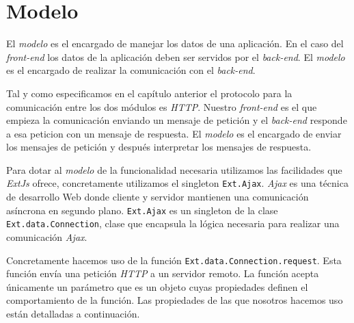 \section{Modelo}
	El \emph{modelo} es el encargado de manejar los datos de una aplicación. En el caso del \emph{front-end} los datos de la aplicación deben ser
	servidos por el \emph{back-end}. El \emph{modelo} es el encargado de realizar la comunicación con el \emph{back-end}. 
	\par
	Tal y como especificamos en el  capítulo anterior el protocolo para la comunicación entre los dos módulos es \emph{HTTP}. Nuestro
	\emph{front-end} es el que empieza la comunicación enviando un mensaje de petición y el \emph{back-end} responde a esa peticion con un mensaje
	de respuesta. El \emph{modelo} es el encargado de enviar los mensajes de petición y después interpretar los mensajes de respuesta.
	\par
	Para dotar al \emph{modelo} de la funcionalidad necesaria utilizamos las facilidades que \emph{ExtJs} ofrece, concretamente utilizamos el singleton
	\texttt{Ext.Ajax}. \emph{Ajax}\cite{AjaxWiki} es una técnica de desarrollo Web donde cliente y servidor mantienen una comunicación asíncrona en
	segundo plano. \texttt{Ext.Ajax} es un singleton de la clase \texttt{Ext.data.Connection}, clase que encapsula la lógica necesaria para
	realizar una comunicación \emph{Ajax}. 
	\par
	Concretamente hacemos uso de la función \texttt{Ext.data.Connection.request}. Esta función envía una petición \emph{HTTP} a un servidor
	remoto. La función acepta únicamente un parámetro que es un objeto cuyas propiedades definen el comportamiento de la función. Las propiedades de las
	que nosotros hacemos uso están detalladas a continuación. 

